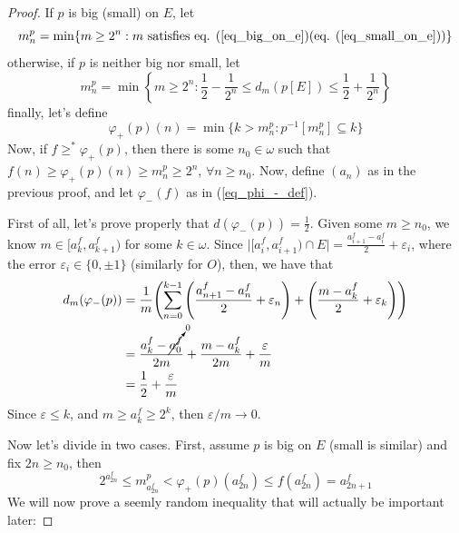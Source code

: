 \begin{proof}
    If $p$ is big (small) on $E$, let
    $$m_n^p=\min\{m\geq 2^n:m\text{ satisfies eq. }(\ref{eq_big_on_e})(\text{eq. }(\ref{eq_small_on_e}))\}$$
    otherwise, if $p$ is neither big nor small, let
    $$m_n^p=\min\left\{m\geq2^n:\frac12-\frac1{2^n}\leq d_m(p[E])\leq\frac12+\frac1{2^n}\right\}$$
    finally, let's define
    $$\varphi_+(p)(n)=\min\{k>m_n^p:p^{-1}[m_n^p]\subseteq k\}$$
    Now, if $f\geq^*\varphi_+(p)$, then there is some $n_0\in\omega$ such that $f(n)\geq\varphi_+(p)(n)\geq m_n^p\geq 2^n$, $\forall n\geq n_0$. Now, define $(a_n)$ as in the previous proof, and let $\varphi_-(f)$ as in (\ref{eq_phi_-_def}).

    First of all, let's prove properly that $d(\varphi_-(p))=\frac12$. Given some $m\geq n_0$, we know $m\in[a_k^f,a_{k+1}^f)$ for some $k\in\omega$. Since $\lvert[a_i^f,a_{i+1}^f)\cap E\rvert=\frac{a_{i+1}^f-a_i^f}{2}+\varepsilon_i$, where the error $\varepsilon_i\in\{0,\pm1\}$ (similarly for $O$), then, we have that
    \begin{align*}
        d_m(\varphi_-(p)) & = \frac1m{\left(\sum_{n=0}^{k-1}{\left(\frac{a_{n+1}^f-a_n^f}{2}+\varepsilon_n\right)}+{\left(\frac{m-a_k^f}{2}+\varepsilon_k\right)}\right)}\\
        & = \frac{a^f_k-\cancelto{0}{a_0^f}}{2m}+\frac{m-a_k^f}{2m}+\frac{\varepsilon}{m}\\
        & = \frac12+\frac{\varepsilon}m
    \end{align*}
    Since $\varepsilon\leq k$, and $m\geq a_k^f\geq 2^k$, then $\varepsilon/m\to0$.

    Now let's divide in two cases. First, assume $p$ is big on $E$ (small is similar) and fix $2n\geq n_0$, then
    $$2^{a_{2n}^f}\leq m_{a_{2n}^f}^p<\varphi_+(p)(a_{2n}^f)\leq f(a_{2n}^f)=a_{2n+1}^f$$
    We will now prove a seemly random inequality that will actually be important later:
    

\end{proof}
